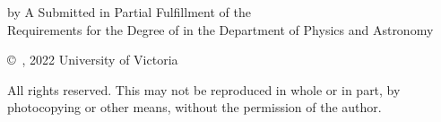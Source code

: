 \pagebreak
{
	\centering
	\thesistitle
	\tpbreak
	by
	\tpbreak
	\nameanddegrees
	\tpbreak
	A \PhDorMas Submitted in Partial Fulfillment of the \\
	Requirements for the Degree of
	\tpbreak
	\PhDorMaster
	\tpbreak
	in the Department of Physics and Astronomy\\
	\vfill
	\begin{center}
		\copyright\ \yourname, 2022 \linebreak
		\phantom{\copyright} University of Victoria
	\end{center}
	All rights reserved. This \PhDorMas may not be reproduced in whole or in part, by \\
	\hfill photocopying or other means, without the permission of the author. 
	\hfill
}
\pagebreak
